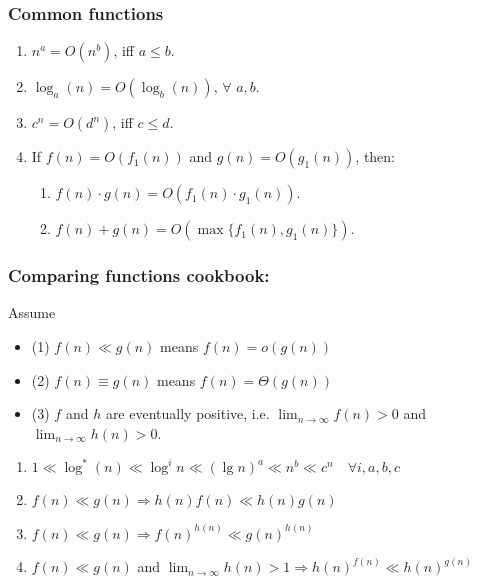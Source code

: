 \documentclass{article}
\begin{document}
\subsubsection{Common functions}
\begin{definition}
    \begin{enumerate}
        \item \( n^a = O(n^b) \), iff \( a \leq b \).
        \item \( \log_a(n) = O(\log_b(n)) \), $\forall$ \( a, b \).
        \item \( c^n = O(d^n) \), iff \( c \leq d \).
        \item If \( f(n) = O(f_1(n)) \) and \( g(n) = O(g_1(n)) \), then:
        \begin{enumerate}
            \item \( f(n) \cdot g(n) = O(f_1(n) \cdot g_1(n)) \).
            \item \( f(n) + g(n) = O(\max\{f_1(n), g_1(n)\}) \).
        \end{enumerate}
    \end{enumerate}
\end{definition}

\subsubsection{Comparing functions cookbook:}
\begin{definition}
    Assume 
    \begin{itemize}
        \item (1) \( f(n) \ll g(n) \) means \( f(n) = o(g(n)) \)
        \item (2) $f(n) \equiv g(n)$ means $f(n) = \Theta(g(n))$
        \item (3) \( f \) and \( h \) are eventually positive, i.e. \( \lim_{n \to \infty} f(n) > 0 \) and \( \lim_{n \to \infty} h(n) > 0 \). 
    \end{itemize}

    \begin{enumerate}
        \item \( 1 \ll \log^*(n) \ll \log^i n \ll (\lg n)^a \ll n^b \ll c^n \quad \forall i, a, b, c \)
        
        \item \( f(n) \ll g(n) \Rightarrow h(n)f(n) \ll h(n)g(n) \)
        
        \item \( f(n) \ll g(n) \Rightarrow f(n)^{h(n)} \ll g(n)^{h(n)} \)
        
        \item \( f(n) \ll g(n) \) and \( \lim_{n \to \infty} h(n) > 1 \Rightarrow h(n)^{f(n)} \ll h(n)^{g(n)} \)
    \end{enumerate}
\end{definition}
\end{document}
